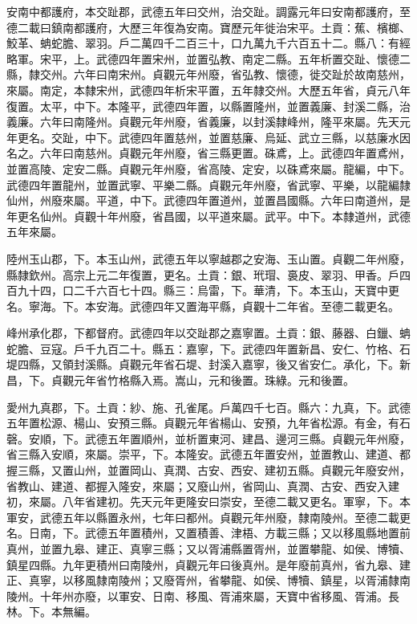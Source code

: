 \begin{pinyinscope}
 安南中都護府，本交趾郡，武德五年曰交州，治交趾。調露元年曰安南都護府，至德二載曰鎮南都護府，大歷三年復為安南。寶歷元年徙治宋平。土貢：蕉、檳榔、鮫革、蚺蛇膽、翠羽。戶二萬四千二百三十，口九萬九千六百五十二。縣八：有經略軍。宋平，上。武德四年置宋州，並置弘教、南定二縣。五年析置交趾、懷德二縣，隸交州。六年曰南宋州。貞觀元年州廢，省弘教、懷德，徙交趾於故南慈州，來屬。南定，本隸宋州，武德四年析宋平置，五年隸交州。大歷五年省，貞元八年復置。太平，中下。本隆平，武德四年置，以縣置隆州，並置義廉、封溪二縣，治義廉。六年曰南隆州。貞觀元年州廢，省義廉，以封溪隸峰州，隆平來屬。先天元年更名。交趾，中下。武德四年置慈州，並置慈廉、烏延、武立三縣，以慈廉水因名之。六年曰南慈州。貞觀元年州廢，省三縣更置。硃鳶，上。武德四年置鳶州，並置高陵、定安二縣。貞觀元年州廢，省高陵、定安，以硃鳶來屬。龍編，中下。武德四年置龍州，並置武寧、平樂二縣。貞觀元年州廢，省武寧、平樂，以龍編隸仙州，州廢來屬。平道，中下。武德四年置道州，並置昌國縣。六年曰南道州，是年更名仙州。貞觀十年州廢，省昌國，以平道來屬。武平。中下。本隸道州，武德五年來屬。



 陸州玉山郡，下。本玉山州，武德五年以寧越郡之安海、玉山置。貞觀二年州廢，縣隸欽州。高宗上元二年復置，更名。土貢：銀、玳瑁、裛皮、翠羽、甲香。戶四百九十四，口二千六百七十四。縣三：烏雷，下。華清，下。本玉山，天寶中更名。寧海。下。本安海。武德四年又置海平縣，貞觀十二年省。至德二載更名。



 峰州承化郡，下都督府。武德四年以交趾郡之嘉寧置。土貢：銀、藤器、白鑞、蚺蛇膽、豆寇。戶千九百二十。縣五：嘉寧，下。武德四年置新昌、安仁、竹格、石堤四縣，又領封溪縣。貞觀元年省石堤、封溪入嘉寧，後又省安仁。承化，下。新昌，下。貞觀元年省竹格縣入焉。嵩山，元和後置。珠綠。元和後置。



 愛州九真郡，下。土貢：紗、施、孔雀尾。戶萬四千七百。縣六：九真，下。武德五年置松源、楊山、安預三縣。貞觀元年省楊山、安預，九年省松源。有金，有石磬。安順，下。武德五年置順州，並析置東河、建昌、邊河三縣。貞觀元年州廢，省三縣入安順，來屬。崇平，下。本隆安。武德五年置安州，並置教山、建道、都握三縣，又置山州，並置岡山、真潤、古安、西安、建初五縣。貞觀元年廢安州，省教山、建道、都握入隆安，來屬；又廢山州，省岡山、真潤、古安、西安入建初，來屬。八年省建初。先天元年更隆安曰崇安，至德二載又更名。軍寧，下。本軍安，武德五年以縣置永州，七年曰都州。貞觀元年州廢，隸南陵州。至德二載更名。日南，下。武德五年置積州，又置積善、津梧、方載三縣；又以移風縣地置前真州，並置九皋、建正、真寧三縣；又以胥浦縣置胥州，並置攀龍、如侯、博犢、鎮星四縣。九年更積州曰南陵州，貞觀元年曰後真州。是年廢前真州，省九皋、建正、真寧，以移風隸南陵州；又廢胥州，省攀龍、如侯、博犢、鎮星，以胥浦隸南陵州。十年州亦廢，以軍安、日南、移風、胥浦來屬，天寶中省移風、胥浦。長林。下。本無編。




\end{pinyinscope}
